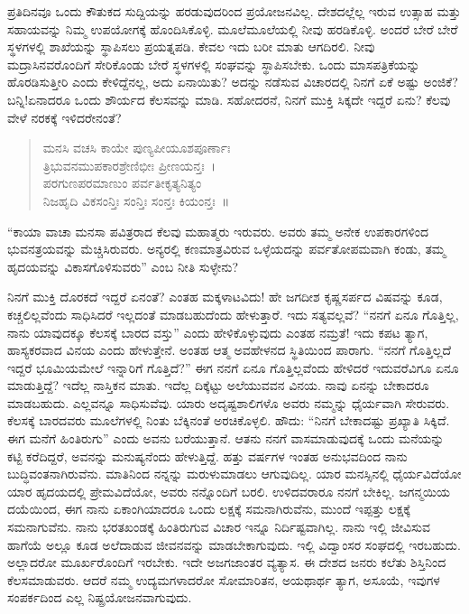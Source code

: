ಪ್ರತಿದಿನವೂ ಒಂದು ಕೌತುಕದ ಸುದ್ದಿಯನ್ನು ಹರಡುವುದರಿಂದ ಪ್ರಯೋಜನವಿಲ್ಲ. ದೇಶದಲ್ಲೆಲ್ಲ ಇರುವ ಉತ್ಸಾಹ ಮತ್ತು ಸಹಾಯವನ್ನು ನಿಮ್ಮ ಉಪಯೋಗಕ್ಕೆ ಹೊಂದಿಸಿಕೊಳ್ಳಿ. ಮೂಲೆಮೂಲೆಯಲ್ಲಿ ನೀವು ಹರಡಿಕೊಳ್ಳಿ. ಅಂದರೆ ಬೇರೆ ಬೇರೆ ಸ್ಥಳಗಳಲ್ಲಿ ಶಾಖೆಯನ್ನು ಸ್ಥಾಪಿಸಲು ಪ್ರಯತ್ನಪಡಿ. ಕೇವಲ ಇದು ಬರೀ ಮಾತು ಆಗದಿರಲಿ. ನೀವು ಮದ್ರಾಸಿನವರೊಂದಿಗೆ ಸೇರಿಕೊಂಡು ಬೇರೆ ಸ್ಥಳಗಳಲ್ಲಿ ಸಂಘವನ್ನು ಸ್ಥಾಪಿಸಬೇಕು. ಒಂದು ಮಾಸಪತ್ರಿಕೆಯನ್ನು ಹೊರಡಿಸುತ್ತೀರಿ ಎಂದು ಕೇಳಿದ್ದೆನಲ್ಲ, ಅದು ಏನಾಯಿತು? ಅದನ್ನು ನಡೆಸುವ ವಿಚಾರದಲ್ಲಿ ನಿನಗೆ ಏಕೆ ಅಷ್ಟು ಅಂಜಿಕೆ? ಬನ್ನಿ!ಏನಾದರೂ ಒಂದು ಶೌರ್ಯದ ಕೆಲಸವನ್ನು ಮಾಡಿ. ಸಹೋದರನೆ, ನಿನಗೆ ಮುಕ್ತಿ ಸಿಕ್ಕದೇ ಇದ್ದರೆ ಏನು? ಕೆಲವು ವೇಳೆ ನರಕಕ್ಕೆ ಇಳಿದರೇನಂತೆ?
\begin{verse}
 ಮನಸಿ ವಚಸಿ ಕಾಯೇ ಪುಣ್ಯಪೀಯೂಶಪೂರ್ಣಾಃ\\
 ತ್ರಿಭುವನಮುಪಕಾರಶ್ರೇಣಿಭೀಃ ಪ್ರೀಣಯನ್ತಃ~।\\
 ಪರಗುಣಪರಮಾಣುಂ ಪರ್ವತೀಕೃತ್ಯನಿತ್ಯಂ\\
 ನಿಜಹೃದಿ ವಿಕಸಂನ್ತಿಃ ಸಂನ್ತಿಃ ಸಂನ್ತಃ ಕಿಯಂನ್ತಃ~॥ 
\end{verse}

“ಕಾಯಾ ವಾಚಾ ಮನಸಾ ಪವಿತ್ರರಾದ ಕೆಲವು ಮಹಾತ್ಮರು ಇರುವರು. ಅವರು ತಮ್ಮ ಅನೇಕ ಉಪಕಾರಗಳಿಂದ ಭುವನತ್ರಯವನ್ನು ಮೆಚ್ಚಿಸಿರುವರು. ಅನ್ಯರಲ್ಲಿ ಕಣಮಾತ್ರವಿರುವ ಒಳ್ಳೆಯದನ್ನು ಪರ್ವತೋಪಮವಾಗಿ ಕಂಡು, ತಮ್ಮ ಹೃದಯವನ್ನು ವಿಕಾಸಗೊಳಿಸುವರು” ಎಂಬ ನೀತಿ ಸುಳ್ಳೇನು?

ನಿನಗೆ ಮುಕ್ತಿ ದೊರಕದೆ ಇದ್ದರೆ ಏನಂತೆ? ಎಂತಹ ಮಕ್ಕಳಾಟವಿದು! ಹೇ ಜಗದೀಶ ಕೃಷ್ಣಸರ್ಪದ ವಿಷವನ್ನು ಕೂಡ, ಕಚ್ಚಲಿಲ್ಲವೆಂದು ಸಾಧಿಸಿದರೆ ಇಲ್ಲದಂತೆ ಮಾಡಬಹುದೆಂದು ಹೇಳುತ್ತಾರೆ. ಇದು ಸತ್ಯವಲ್ಲವೆ? “ನನಗೆ ಏನೂ ಗೊತ್ತಿಲ್ಲ, ನಾನು ಯಾವುದಕ್ಕೂ ಕೆಲಸಕ್ಕೆ ಬಾರದ ವಸ್ತು” ಎಂದು ಹೇಳಿಕೊಳ್ಳುವುದು ಎಂತಹ ನಮ್ರತೆ! ಇದು ಕಪಟ ತ್ಯಾಗ, ಹಾಸ್ಯಕರವಾದ ವಿನಯ ಎಂದು ಹೇಳುತ್ತೇನೆ. ಅಂತಹ ಆತ್ಮ ಅವಹೇಳನದ ಸ್ಥಿತಿಯಿಂದ ಪಾರಾಗು. “ನನಗೆ ಗೊತ್ತಿಲ್ಲದೆ ಇದ್ದರೆ ಭೂಮಿಯಮೇಲೆ ಇನ್ನಾರಿಗೆ ಗೊತ್ತಿದೆ?” ಈಗ ನನಗೆ ಏನೂ ಗೊತ್ತಿಲ್ಲವೆಂದು ಹೇಳಿದರೆ ಇದುವರೆವಿಗೂ ಏನೂ ಮಾಡುತ್ತಿದ್ದೆ? ಇದೆಲ್ಲ ನಾಸ್ತಿಕನ ಮಾತು. ಇದೆಲ್ಲ ದಿಕ್ಕೆಟ್ಟು ಅಲೆಯುವವನ ವಿನಯ. ನಾವು ಏನನ್ನು ಬೇಕಾದರೂ ಮಾಡಬಹುದು. ಎಲ್ಲವನ್ನೂ ಸಾಧಿಸುವೆವು. ಯಾರು ಅದೃಷ್ಟಶಾಲಿಗಳೊ ಅವರು ನಮ್ಮನ್ನು ಧೈರ್ಯವಾಗಿ ಸೇರುವರು. ಕೆಲಸಕ್ಕೆ ಬಾರದವರು ಮೂಲೆಗಳಲ್ಲಿ ನಿಂತು ಬೆಕ್ಕಿನಂತೆ ಅರಚಿಕೊಳ್ಳಲಿ. ಹೌದು: “ನಿನಗೆ ಬೇಕಾದಷ್ಟು ಪ್ರಖ್ಯಾತಿ ಸಿಕ್ಕಿದೆ. ಈಗ ಮನೆಗೆ ಹಿಂತಿರುಗು” ಎಂದು ಅವನು ಬರೆಯುತ್ತಾನೆ. ಆತನು ನನಗೆ ವಾಸಮಾಡುವುದಕ್ಕೆ ಒಂದು ಮನೆಯನ್ನು ಕಟ್ಟಿ ಕರೆದಿದ್ದರೆ, ಅವನನ್ನು ಮನುಷ್ಯನೆಂದು ಹೇಳುತ್ತಿದ್ದೆ. ಹತ್ತು ವರ್ಷಗಳ ಇಂತಹ ಅನುಭವದಿಂದ ನಾನು ಬುದ್ಧಿವಂತನಾಗಿರುವೆನು. ಮಾತಿನಿಂದ ನನ್ನನ್ನು ಮರುಳುಮಾಡಲು ಆಗುವುದಿಲ್ಲ. ಯಾರ ಮನಸ್ಸಿನಲ್ಲಿ ಧೈರ್ಯವಿದೆಯೋ ಯಾರ ಹೃದಯದಲ್ಲಿ ಪ್ರೇಮವಿದೆಯೋ, ಅವರು ನನ್ನೊಂದಿಗೆ ಬರಲಿ. ಉಳಿದವರಾರೂ ನನಗೆ ಬೇಕಿಲ್ಲ. ಜಗನ್ಮಯಿಯ ದಯೆಯಿಂದ, ಈಗ ನಾನು ಏಕಾಂಗಿಯಾದರೂ ಒಂದು ಲಕ್ಷಕ್ಕೆ ಸಮನಾಗಿರುವೆನು, ಮುಂದೆ ಇಪ್ಪತ್ತು ಲಕ್ಷಕ್ಕೆ ಸಮನಾಗುವೆನು. ನಾನು ಭರತಖಂಡಕ್ಕೆ ಹಿಂತಿರುಗುವ ವಿಚಾರ ಇನ್ನೂ ನಿರ್ದಿಷ್ಟವಾಗಿಲ್ಲ. ನಾನು ಇಲ್ಲಿ ಜೀವಿಸುವ ಹಾಗೆಯೆ ಅಲ್ಲೂ ಕೂಡ ಅಲೆದಾಡುವ ಜೀವನವನ್ನು ಮಾಡಬೇಕಾಗುವುದು. ಇಲ್ಲಿ ವಿದ್ವಾಂಸರ ಸಂಘದಲ್ಲಿ ಇರಬಹುದು. ಅಲ್ಲಾದರೋ ಮೂರ್ಖರೊಂದಿಗೆ ಇರಬೇಕು. ಇದೇ ಅಜಗಜಾಂತರ ವ್ಯತ್ಯಾಸ. ಈ ದೇಶದ ಜನರು ಕಲೆತು ಶಿಸ್ತಿನಿಂದ ಕೆಲಸಮಾಡುವರು. ಆದರೆ ನಮ್ಮ ಉದ್ಯಮಗಳಾದರೋ ಸೋಮಾರಿತನ, ಅಯಥಾರ್ಥ ತ್ಯಾಗ, ಅಸೂಯೆ, ಇವುಗಳ ಸಂಪರ್ಕದಿಂದ ಎಲ್ಲ ನಿಷ್ಪ್ರಯೋಜನವಾಗುವುದು.
\vspace{0.3cm}

